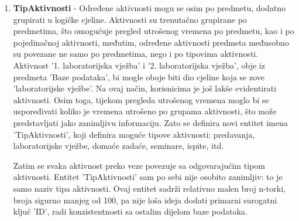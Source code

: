 \documentclass[times, utf8, zavrsni]{fer}
\begin{document}
\begin{enumerate}[leftmargin=*]
\item \textbf{TipAktivnosti} - 
Određene aktivnosti mogu se osim po predmetu, dodatno grupirati u logičke cjeline. Aktivnosti su trenutačno grupirane po predmetima, što omogućuje pregled utrošenog vremena po predmetu, kao i po pojedinačnoj aktivnosti, međutim, određene aktivnosti predmeta međusobno su povezane ne samo po predmetima, nego i po tipovima aktivnosti. Aktivnost '1. laboratorijska vježba' i '2. laboratorijska vježba', obje iz predmeta 'Baze podataka', bi mogle oboje biti dio cjeline koja se zove 'laboratorijske vježbe'. Na ovaj način, korisnicima je još lakše evidentirati aktivnosti. Osim toga, tijekom pregleda utrošenog vremena moglo bi se uspoređivati koliko je vremena utrošeno po grupama aktivnosti, što može predstavljati jako zanimljivu informaciju. Zato se definira novi entitet imena 'TipAktivnosti', koji definira moguće tipove aktivnosti: predavanja, laboratorijske vježbe, domaće zadaće, seminare, ispite, itd.

Zatim se svaka aktivnost preko veze povezuje sa odgovarajućim tipom aktivnosti. Entitet 'TipAktivnosti' sam po sebi nije osobito zanimljiv: to je samo naziv tipa aktivnosti. Ovaj entitet sadrži relativno malen broj n-torki, broja sigurno manjeg od 100, pa nije loša ideja dodati primarni surogatni ključ 'ID', radi konzistentnosti sa ostalim dijelom baze podataka.
\end{enumerate}
\end{document}
